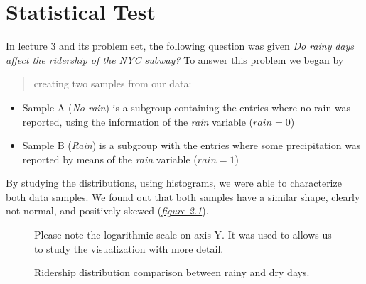 \documentclass[a4paper,12pt,english]{sphinxmanual}
\begin{document}
\chapter{Statistical Test}
\label{section1:statistical-test}\label{section1::doc}
In lecture 3 and its problem set, the following question was given \emph{Do rainy}
\emph{days affect the ridership of the NYC subway?} To answer this problem we began by
\begin{quote}

creating two samples from our data:
\end{quote}
\begin{itemize}
\item {} 
Sample A (\emph{No rain}) is a subgroup containing the entries where no rain was reported, using the
information of the \emph{rain} variable (\(rain = 0\))

\item {} 
Sample B (\emph{Rain}) is a subgroup with the entries where some precipitation was reported
by means of the \emph{rain} variable (\(rain = 1\))

\end{itemize}

By studying the distributions, using histograms, we were able to characterize
both data samples. We found out that both samples have a similar shape, clearly
not normal, and positively skewed ({\hyperref[section1:figure21]{\emph{figure 2.1}}}).
\begin{figure}[htbp]
\centering
\capstart

\caption{Ridership distribution comparison between rainy and dry days.}{\small 
Please note the logarithmic scale on axis Y. It was used to allows us to study
the visualization with more detail.
}\label{section1:figure21}\end{figure}
\end{document}
